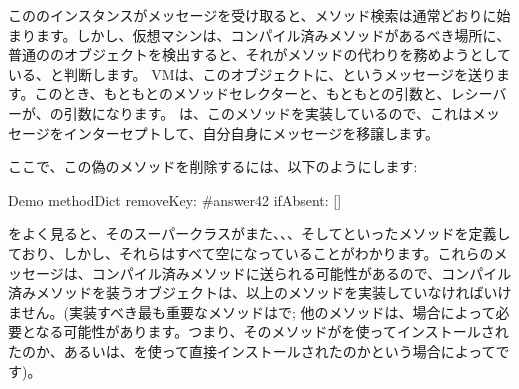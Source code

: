 \documentclass[a4paper,10pt,twoside]{book}
\begin{document}
こののインスタンスがメッセージを受け取ると、メソッド検索は通常どおりに始まります。しかし、仮想マシンは、コンパイル済みメソッドがあるべき場所に、普通の\st{}のオブジェクトを検出すると、それがメソッドの代わりを務めようとしている、と判断します。%
VMは、このオブジェクトに、というメッセージを送ります。このとき、もともとのメソッドセレクターと、もともとの引数と、レシーバーが、の引数になります。%
は、このメソッドを実装しているので、これはメッセージをインターセプトして、自分自身にメッセージを移譲します。

ここで、この偽のメソッドを削除するには、以下のようにします:
\begin{code}{}
Demo methodDict removeKey: #answer42 ifAbsent: []
\end{code}

をよく見ると、そのスーパークラスがまた、、、そしてといったメソッドを定義しており、しかし、それらはすべて空になっていることがわかります。これらのメッセージは、コンパイル済みメソッドに送られる可能性があるので、コンパイル済みメソッドを装うオブジェクトは、以上のメソッドを実装していなければいけません。(実装すべき最も重要なメソッドはで; 他のメソッドは、場合によって必要となる可能性があります。つまり、そのメソッドがを使ってインストールされたのか、あるいは、を使って直接インストールされたのかという場合によってです)。 %
\end{document}
